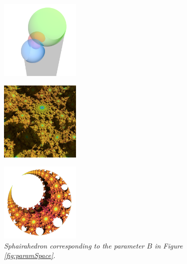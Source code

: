 \begin{figure}[htbp]
 \begin{minipage}[t]{0.5\textwidth}
  \begin{minipage}[t]{0.24\textwidth}
   \centering
   \includegraphics[width=1.5in, height=1.5in, keepaspectratio]{./img/application/sphairahedron/derivation/prism0864.png}
   \label{fig:pointBSphaira}
  \end{minipage}
  \hspace*{\fill}
  \begin{minipage}[t]{0.24\textwidth}
   \centering
   \includegraphics[width=1.5in, height=1.5in,
   keepaspectratio]{./img/application/sphairahedron/derivation/limit0864.jpg}
   \label{fig:pointBLimit}
  \end{minipage}
  \hspace*{\fill}
  \caption{\textit{Sphairahedron corresponding to the parameter $B$
  in Figure \ref{fig:paramSpace}.}}
  \label{fig:pointB}
 \end{minipage}
 \hspace*{\fill}
 \begin{minipage}[t]{0.5\textwidth}
  \begin{minipage}[t]{0.24\textwidth}
   \centering
   \includegraphics[width=1.5in, height=1.5in,
   keepaspectratio]{./img/application/sphairahedron/derivation/conj1.png}

\end{minipage}
\end{minipage}
\end{figure}
